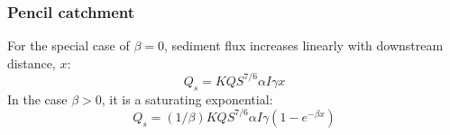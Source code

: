 \documentclass[journal abbreviation, manuscript]{copernicus}
\begin{document}
\subsubsection*{Pencil catchment}

For the special case of $\beta = 0$, sediment flux increases linearly with downstream distance, $x$:
\begin{equation}
    Q_s = K Q S^{7/6} \alpha I \gamma x
\end{equation}
In the case $\beta > 0$, it is a saturating exponential:
\begin{equation}
    Q_s = (1/\beta) K Q S^{7/6} \alpha I \gamma (1 - e^{-\beta x})
\end{equation}
\end{document}
